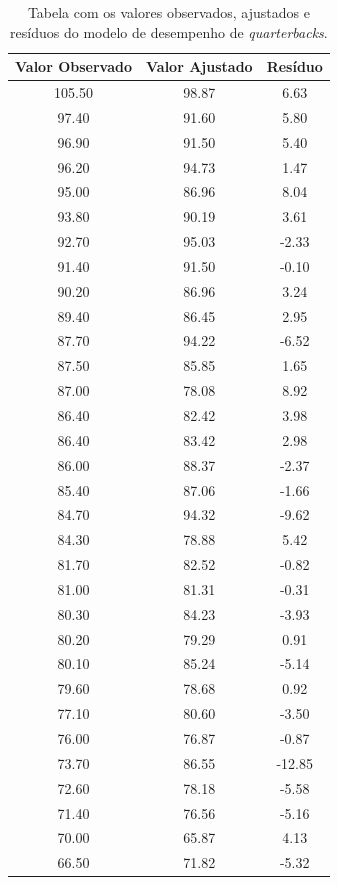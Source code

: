 \documentclass{article}
\begin{document}
\begin{table}[H]
\centering
\begin{tabular}{|c|c|c|}
\hline
\textbf{Valor Observado} & \textbf{Valor Ajustado} & \textbf{Resíduo} \\ \hline
105.50 & 98.87 & 6.63 \\ \hline
97.40 & 91.60 & 5.80 \\ \hline
96.90 & 91.50 & 5.40 \\ \hline
96.20 & 94.73 & 1.47 \\ \hline
95.00 & 86.96 & 8.04 \\ \hline
93.80 & 90.19 & 3.61 \\ \hline
92.70 & 95.03 & -2.33 \\ \hline
91.40 & 91.50 & -0.10 \\ \hline
90.20 & 86.96 & 3.24 \\ \hline
89.40 & 86.45 & 2.95 \\ \hline
87.70 & 94.22 & -6.52 \\ \hline
87.50 & 85.85 & 1.65 \\ \hline
87.00 & 78.08 & 8.92 \\ \hline
86.40 & 82.42 & 3.98 \\ \hline
86.40 & 83.42 & 2.98 \\ \hline
86.00 & 88.37 & -2.37 \\ \hline
85.40 & 87.06 & -1.66 \\ \hline
84.70 & 94.32 & -9.62 \\ \hline
84.30 & 78.88 & 5.42 \\ \hline
81.70 & 82.52 & -0.82 \\ \hline
81.00 & 81.31 & -0.31 \\ \hline
80.30 & 84.23 & -3.93 \\ \hline
80.20 & 79.29 & 0.91 \\ \hline
80.10 & 85.24 & -5.14 \\ \hline
79.60 & 78.68 & 0.92 \\ \hline
77.10 & 80.60 & -3.50 \\ \hline
76.00 & 76.87 & -0.87 \\ \hline
73.70 & 86.55 & -12.85 \\ \hline
72.60 & 78.18 & -5.58 \\ \hline
71.40 & 76.56 & -5.16 \\ \hline
70.00 & 65.87 & 4.13 \\ \hline
66.50 & 71.82 & -5.32 \\ \hline
\end{tabular}
\caption{Tabela com os valores observados, ajustados e resíduos do modelo de desempenho de \textit{quarterbacks}.}
\label{tab:todos_residuos}
\end{table}
\end{document}
